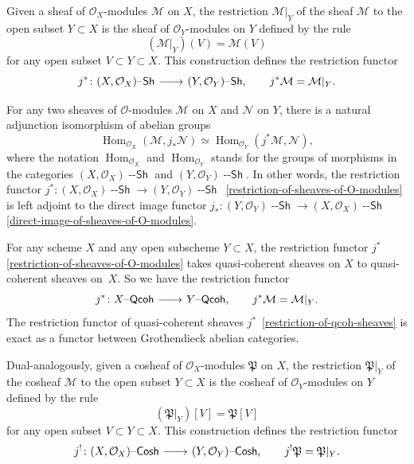 \documentclass[12pt,a4paper]{amsart}
\newcommand{\+}{\nobreakdash-}
\renewcommand{\:}{\colon}
\newcommand{\rarrow}{\longrightarrow}
\newcommand{\lrarrow}{\mskip.5\thinmuskip\relbar\joinrel\relbar
   \joinrel\rightarrow\mskip.5\thinmuskip\relax}
\DeclareMathOperator{\Hom}{Hom}
\newcommand{\Qcoh}{{\operatorname{\mathsf{--Qcoh}}}}
\newcommand{\Sh}{{\operatorname{\mathsf{--Sh}}}}
\newcommand{\Cosh}{{\operatorname{\mathsf{--Cosh}}}}
\newcommand{\cO}{\mathcal O}
\newcommand{\cM}{\mathcal M}
\newcommand{\cN}{\mathcal N}
\newcommand{\fP}{\mathfrak P}
\theoremstyle{plain}
\theoremstyle{definition}
\begin{document}
 Given a sheaf of $\cO_X$\+modules $\cM$ on $X$, the restriction
$\cM|_Y$ of the sheaf $\cM$ to the open subset $Y\subset X$ is
the sheaf of $\cO_Y$\+modules on $Y$ defined by the rule
$$
 (\cM|_Y)(V)=\cM(V)
$$
for any open subset $V\subset Y\subset X$.
 This construction defines the restriction functor
\begin{equation} \label{restriction-of-sheaves-of-O-modules}
 j^*\:(X,\cO_X)\Sh\lrarrow(Y,\cO_Y)\Sh, \qquad j^*\cM=\cM|_Y.
\end{equation}

 For any two sheaves of $\cO$\+modules $\cM$ on $X$ and $\cN$ on $Y$,
there is a natural adjunction isomorphism of abelian groups
\begin{equation} \label{sheaves-direct-image-restriction-adjunction}
 \Hom_{\cO_X}(\cM,j_*\cN)\simeq\Hom_{\cO_Y}(j^*\cM,\cN),
\end{equation}
where the notation $\Hom_{\cO_X}$ and $\Hom_{\cO_Y}$ stands for
the groups of morphisms in the categories $(X,\cO_X)\Sh$ and
$(Y,\cO_Y)\Sh$.
 In other words, the restriction functor $j^*\:(X,\cO_X)\Sh\rarrow
(Y,\cO_Y)\Sh$ \,\eqref{restriction-of-sheaves-of-O-modules} is
left adjoint to the direct image functor $j_*\:(Y,\cO_Y)\Sh\rarrow
(X,\cO_X)\Sh$ \,\eqref{direct-image-of-sheaves-of-O-modules}.

 For any scheme $X$ and any open subscheme $Y\subset X$,
the restriction functor $j^*$
\,\eqref{restriction-of-sheaves-of-O-modules} takes quasi-coherent
sheaves on $X$ to quasi-coherent sheaves on~$X$.
 So we have the restriction functor
\begin{equation} \label{restriction-of-qcoh-sheaves}
 j^*\:X\Qcoh\lrarrow Y\Qcoh, \qquad j^*\cM=\cM|_Y.
\end{equation}
 The restriction functor of quasi-coherent sheaves $j^*$
\,\eqref{restriction-of-qcoh-sheaves} is exact as a functor between
Grothendieck abelian categories.

 Dual-analogously, given a cosheaf of $\cO_X$\+modules $\fP$ on $X$,
the restriction $\fP|_Y$ of the cosheaf $\cM$ to the open subset
$Y\subset X$ is the cosheaf of $\cO_Y$\+modules on $Y$ defined by
the rule
$$
 (\fP|_Y)[V]=\fP[V]
$$
for any open subset $V\subset Y\subset X$.
 This construction defines the restriction functor
\begin{equation} \label{restriction-of-cosheaves-of-O-modules}
 j^!\:(X,\cO_X)\Cosh\lrarrow(Y,\cO_Y)\Cosh, \qquad j^!\fP=\fP|_Y.
\end{equation}
\end{document}
